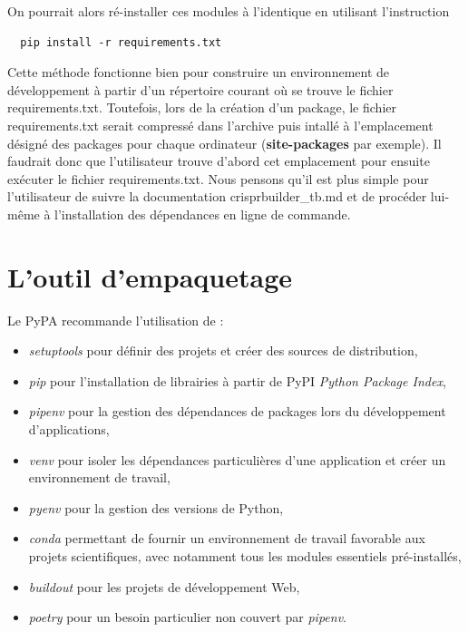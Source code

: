 \documentclass[twoside,a4paper,11pt,frenchb,openany]{report}
\begin{document}
On pourrait alors ré-installer ces modules à l'identique en utilisant l'instruction
\begin{verbatim}  pip install -r requirements.txt\end{verbatim}

Cette méthode fonctionne bien pour construire un environnement de développement à partir d'un répertoire courant où se trouve le fichier requirements.txt. Toutefois, lors de la création d'un package, le fichier requirements.txt serait compressé dans l'archive puis intallé à l'emplacement désigné des packages pour chaque ordinateur (\textbf{site-packages} par exemple). Il faudrait donc que l'utilisateur trouve d'abord cet emplacement pour ensuite exécuter le fichier requirements.txt. Nous pensons qu'il est plus simple pour l'utilisateur de suivre la documentation crisprbuilder\_tb.md et de procéder lui-même à l'installation des dépendances en ligne de commande.



	

\section{L'outil d'empaquetage}
	
	Le PyPA recommande l'utilisation de :
\begin{itemize}
\item \textit{setuptools} pour définir des projets et créer des sources de distribution,
\item \textit{pip} pour l'installation de librairies à partir de PyPI \textit{Python Package Index},
\item \textit{pipenv} pour la gestion des dépendances de packages lors du développement d'applications,
\item \textit{venv} pour isoler les dépendances particulières d'une application et créer un environnement de travail,
\item \textit{pyenv} pour la gestion des versions de Python,
\item \textit{conda} permettant de fournir un environnement de travail favorable aux projets scientifiques, avec notamment tous les modules essentiels pré-installés,
\item \textit{buildout} pour les projets de développement Web,
\item \textit{poetry} pour un besoin particulier non couvert par \textit{pipenv}.

\end{itemize}
\end{document}
